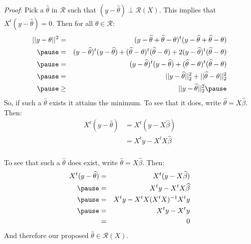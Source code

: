 \begin{frame}[fragile] \frametitle{}

{\it Proof}: Pick a $\widehat{\theta}$ in $\mathcal{R}$ such that
$(y - \widehat{\theta}) \perp \mathcal{R}(X)$. \pause This implies
that $X^{t} (y - \widehat{\theta}) = 0$. Then for all $\theta \in \mathcal{R}$:
\begin{eqnarray*}
|| y - \theta ||^2 &=& (y - \widehat{\theta} + \widehat{\theta} - \theta)^t (y - \widehat{\theta} + \widehat{\theta} - \theta) \\ \pause
&=& (y - \widehat{\theta})^t (y - \widehat{\theta}) + (\widehat{\theta} - \theta)^t (\widehat{\theta} - \theta) +
    2 (y - \widehat{\theta})^t (\widehat{\theta} - \theta) \\ \pause
&=& (y - \widehat{\theta})^t (y - \widehat{\theta}) +
    (\widehat{\theta} - \theta)^t (\widehat{\theta} - \theta) \\ \pause
&=& || y - \widehat{\theta} ||^2_2 + || \widehat{\theta} - \theta ||_2^2 \\ \pause
&\geq& || y - \widehat{\theta} ||^2_2 \pause
\end{eqnarray*}
So, if such a $\widehat{\theta}$ exists it attains the minimum. To see that
it does, write $\widehat{\theta} = X \widehat{\beta}$. \pause Then:
\begin{eqnarray*}
X^t ( y - \widehat{\theta} ) &= X^t ( y - X \widehat{\beta} ) \\
&= X^t y - X^t X \widehat{\beta}
\end{eqnarray*}

\end{frame}

\begin{frame}[fragile] \frametitle{}

To see that such a $\widehat{\theta}$ does exist,
write $\widehat{\theta} = X \widehat{\beta}$. \pause Then:
\begin{eqnarray*}
X^t ( y - \widehat{\theta} ) &=& X^t ( y - X \widehat{\beta} ) \\ \pause
&=& X^t y - X^t X \widehat{\beta} \\ \pause
&=& X^t y - X^t X (X^t X)^{-1} X^t y \\ \pause
&=& X^t y - X^t y \\
&=& 0
\end{eqnarray*}
And therefore our proposed $\widehat{\theta} \in \mathcal{R}(X)$.

\end{frame}

